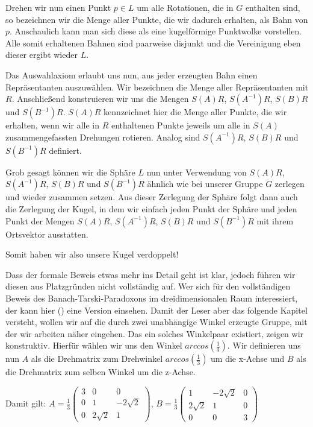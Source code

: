 \documentclass[10pt]{article}
\begin{document}
\noindent Drehen wir nun einen Punkt $p\in L$ um alle Rotationen, die in $G$ enthalten sind, so bezeichnen wir die Menge aller Punkte, die wir dadurch erhalten, als Bahn von $p$. Anschaulich kann man sich diese als eine kugelförmige Punktwolke vorstellen. Alle somit erhaltenen Bahnen sind paarweise disjunkt und die Vereinigung eben dieser ergibt wieder $L$.

\noindent Das Auswahlaxiom erlaubt uns nun, aus jeder erzeugten Bahn einen Repräsentanten auszuwählen. Wir bezeichnen die Menge aller Repräsentanten mit $R$. Anschließend konstruieren wir uns die Mengen $S(A)R$, $S(A^{-1})R$, $S(B)R$ und $S(B^{-1})R$. $S(A)R$ kennzeichnet hier die Menge aller Punkte, die wir erhalten, wenn wir alle in $R$ enthaltenen Punkte jeweils um alle in $S(A)$ zusammengefassten Drehungen rotieren. Analog sind $S(A^{-1})R$, $S(B)R$ und $S(B^{-1})R$ definiert.

\noindent Grob gesagt können wir die Sphäre $L$ nun unter Verwendung von $S(A)R$, $S(A^{-1})R$, $S(B)R$ und $S(B^{-1})R$ ähnlich wie bei unserer Gruppe $G$ zerlegen und wieder zusammen setzen. Aus dieser Zerlegung der Sphäre folgt dann auch die Zerlegung der Kugel, in dem wir einfach jeden Punkt der Sphäre und jeden Punkt der Mengen $S(A)R$, $S(A^{-1})R$, $S(B)R$ und $S(B^{-1})R$ mit ihrem Ortsvektor ausstatten.\par

\noindent Somit haben wir also unsere Kugel verdoppelt!

\noindent Dass der formale Beweis etwas mehr ins Detail geht ist klar, jedoch führen wir diesen aus Platzgründen nicht vollständig auf. Wer sich für den vollständigen Beweis des Banach-Tarski-Paradoxons im dreidimensionalen Raum interessiert, der kann hier (\cite{Q7}) eine Version einsehen. Damit der Leser aber das folgende Kapitel versteht, wollen wir auf die durch zwei unabhängige Winkel erzeugte Gruppe, mit der wir arbeiten näher eingehen. Das ein solches Winkelpaar existiert, zeigen wir konstruktiv. Hierfür wählen wir uns den Winkel $arccos(\frac{1}{3})$. Wir definieren uns nun $A$ als die Drehmatrix zum Drehwinkel $arccos(\frac{1}{3})$ um die x-Achse und $B$ als die Drehmatrix zum selben Winkel um die z-Achse.\par
\noindent Damit gilt: $A=\frac{1}{3}
\begin{pmatrix}
    3 & 0 & 0 \\
    0 & 1 & -2\sqrt{2} \\
    0 & 2\sqrt{2} & 1 
\end{pmatrix}$, $B=\frac{1}{3}
\begin{pmatrix}
    1 & -2\sqrt{2} & 0 \\
    2\sqrt{2} & 1 & 0 \\
    0 & 0 & 3
\end{pmatrix}$
\end{document}
